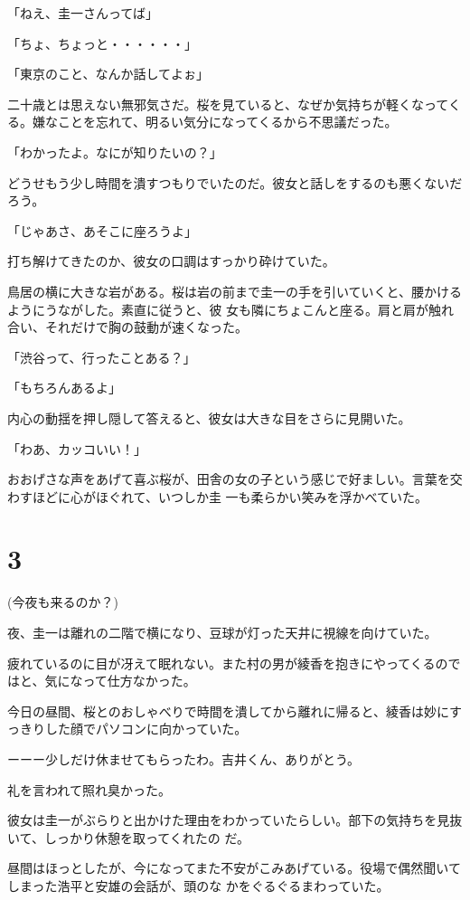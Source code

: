 ﻿\documentclass[book,tate]{jlreq}
\begin{document}
「ねえ、圭一さんってば」

「ちょ、ちょっと・・・・・・」

「東京のこと、なんか話してよぉ」

二十歳とは思えない無邪気さだ。桜を見ていると、なぜか気持ちが軽くなってくる。嫌なことを忘れて、明るい気分になってくるから不思議だった。

「わかったよ。なにが知りたいの？」

どうせもう少し時間を潰すつもりでいたのだ。彼女と話しをするのも悪くないだろう。

「じゃあさ、あそこに座ろうよ」

打ち解けてきたのか、彼女の口調はすっかり砕けていた。

鳥居の横に大きな岩がある。桜は岩の前まで圭一の手を引いていくと、腰かけるようにうながした。素直に従うと、彼 女も隣にちょこんと座る。肩と肩が触れ合い、それだけで胸の鼓動が速くなった。

「渋谷って、行ったことある？」

「もちろんあるよ」

内心の動揺を押し隠して答えると、彼女は大きな目をさらに見開いた。

「わあ、カッコいい！」

おおげさな声をあげて喜ぶ桜が、田舎の女の子という感じで好ましい。言葉を交わすほどに心がほぐれて、いつしか圭 一も柔らかい笑みを浮かべていた。

\section*{3}

(今夜も来るのか？)

夜、圭一は離れの二階で横になり、豆球が灯った天井に視線を向けていた。

疲れているのに目が冴えて眠れない。また村の男が綾香を抱きにやってくるのではと、気になって仕方なかった。

今日の昼間、桜とのおしゃべりで時間を潰してから離れに帰ると、綾香は妙にすっきりした顔でパソコンに向かっていた。

ーーー少しだけ休ませてもらったわ。吉井くん、ありがとう。

礼を言われて照れ臭かった。

彼女は圭一がぶらりと出かけた理由をわかっていたらしい。部下の気持ちを見抜いて、しっかり休憩を取ってくれたの だ。

昼間はほっとしたが、今になってまた不安がこみあげている。役場で偶然聞いてしまった浩平と安雄の会話が、頭のな かをぐるぐるまわっていた。
\end{document}
